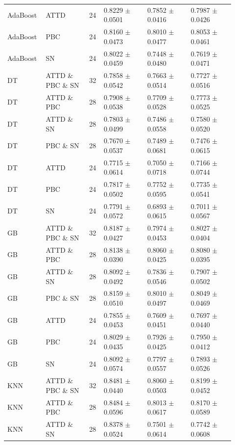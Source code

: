 \documentclass[10pt,a4paper]{article}
\newcommand{\classifiersep}{\addlinespace[1pt]\midrule\addlinespace[1pt]}
\begin{document}
\begin{landscape}
\begin{longtable}{@{}L{0.14\linewidth}L{0.18\linewidth}C{0.06\linewidth}C{0.18\linewidth}C{0.18\linewidth}C{0.18\linewidth}@{}}
AdaBoost & ATTD & 24 & 0.8229 $\pm$ 0.0501 & 0.7852 $\pm$ 0.0416 & 0.7987 $\pm$ 0.0426 \\
AdaBoost & PBC & 24 & 0.8160 $\pm$ 0.0473 & 0.8010 $\pm$ 0.0477 & 0.8053 $\pm$ 0.0461 \\
AdaBoost & SN & 24 & 0.8022 $\pm$ 0.0459 & 0.7448 $\pm$ 0.0480 & 0.7619 $\pm$ 0.0471 \\
\classifiersep
DT & ATTD \& PBC \& SN & 32 & 0.7858 $\pm$ 0.0542 & 0.7663 $\pm$ 0.0514 & 0.7727 $\pm$ 0.0516 \\
DT & ATTD \& PBC & 28 & 0.7908 $\pm$ 0.0538 & 0.7709 $\pm$ 0.0528 & 0.7773 $\pm$ 0.0525 \\
DT & ATTD \& SN & 28 & 0.7803 $\pm$ 0.0499 & 0.7486 $\pm$ 0.0558 & 0.7580 $\pm$ 0.0520 \\
DT & PBC \& SN & 28 & 0.7670 $\pm$ 0.0537 & 0.7489 $\pm$ 0.0681 & 0.7476 $\pm$ 0.0615 \\
DT & ATTD & 24 & 0.7715 $\pm$ 0.0614 & 0.7050 $\pm$ 0.0718 & 0.7166 $\pm$ 0.0744 \\
DT & PBC & 24 & 0.7817 $\pm$ 0.0502 & 0.7752 $\pm$ 0.0595 & 0.7735 $\pm$ 0.0541 \\
DT & SN & 24 & 0.7791 $\pm$ 0.0572 & 0.6893 $\pm$ 0.0615 & 0.7011 $\pm$ 0.0567 \\
\classifiersep
GB & ATTD \& PBC \& SN & 32 & 0.8187 $\pm$ 0.0427 & 0.7974 $\pm$ 0.0453 & 0.8027 $\pm$ 0.0404 \\
GB & ATTD \& PBC & 28 & 0.8138 $\pm$ 0.0390 & 0.8060 $\pm$ 0.0425 & 0.8080 $\pm$ 0.0395 \\
GB & ATTD \& SN & 28 & 0.8092 $\pm$ 0.0492 & 0.7836 $\pm$ 0.0546 & 0.7907 $\pm$ 0.0502 \\
GB & PBC \& SN & 28 & 0.8159 $\pm$ 0.0510 & 0.8010 $\pm$ 0.0497 & 0.8049 $\pm$ 0.0469 \\
GB & ATTD & 24 & 0.7855 $\pm$ 0.0453 & 0.7609 $\pm$ 0.0451 & 0.7697 $\pm$ 0.0440 \\
GB & PBC & 24 & 0.8029 $\pm$ 0.0435 & 0.7926 $\pm$ 0.0425 & 0.7950 $\pm$ 0.0412 \\
GB & SN & 24 & 0.8092 $\pm$ 0.0574 & 0.7797 $\pm$ 0.0557 & 0.7893 $\pm$ 0.0526 \\
\classifiersep
KNN & ATTD \& PBC \& SN & 32 & 0.8481 $\pm$ 0.0440 & 0.8060 $\pm$ 0.0503 & 0.8199 $\pm$ 0.0452 \\
KNN & ATTD \& PBC & 28 & 0.8484 $\pm$ 0.0596 & 0.8013 $\pm$ 0.0617 & 0.8170 $\pm$ 0.0589 \\
KNN & ATTD \& SN & 28 & 0.8378 $\pm$ 0.0524 & 0.7501 $\pm$ 0.0614 & 0.7742 $\pm$ 0.0608 \\

\end{longtable}
\end{landscape}
\end{document}
